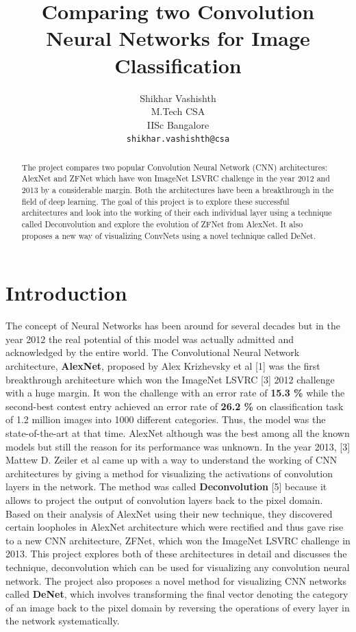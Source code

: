 \documentclass{article} %
\title{Comparing two Convolution Neural Networks for Image Classification}
\author{
	Shikhar Vashishth  \\
	M.Tech CSA\\
	IISc Bangalore \\
	\texttt{shikhar.vashishth@csa} \\
}
\begin{document}
	\maketitle
	
	\begin{abstract}
		The project compares two popular Convolution Neural Network (CNN) architectures: AlexNet and ZFNet which have won ImageNet LSVRC challenge in the year 2012 and 2013 by a considerable margin. Both the architectures have been a breakthrough in the field of deep learning. The goal of this project is to explore these successful architectures and look into the working of their each individual layer using a technique called Deconvolution and explore the evolution of ZFNet from AlexNet. It also proposes a new way of visualizing ConvNets using a novel technique called DeNet.
	\end{abstract}
	
	\section{Introduction}
	The concept of Neural Networks has been around for several decades but in the year 2012 the real potential of this model was actually admitted and acknowledged by the entire world. The Convolutional Neural Network architecture, \textbf{AlexNet}, proposed by Alex Krizhevsky et al [1] was the first breakthrough architecture which won the ImageNet LSVRC [3] 2012 challenge with a huge margin. It won the challenge with an error rate of \textbf{15.3 \%} while the second-best contest entry achieved an error rate of \textbf{26.2 \%} on classification task of 1.2 million images into 1000 different categories. Thus, the model was the state-of-the-art at that time. AlexNet although was the best among all the known models but still the reason for its performance was unknown. In the year 2013, [3] Mattew D. Zeiler et al came up with a way to understand the working of CNN architectures by giving a method for visualizing the activations of convolution layers in the network. The method was called \textbf{Deconvolution} [5] because it allows to project the output of convolution layers back to the pixel domain. Based on their analysis of AlexNet using their new technique, they discovered certain loopholes in AlexNet architecture which were rectified and thus gave rise to a new CNN architecture, ZFNet, which won the ImageNet LSVRC challenge in 2013. This project explores both of these architectures in detail and discusses the technique, deconvolution which can be used for visualizing any convolution neural network. The project also proposes a novel method for visualizing CNN networks called \textbf{DeNet}, which involves transforming the final vector denoting the category of an image back to the pixel domain by reversing the operations of every layer in the network systematically. 
	
\end{document}
